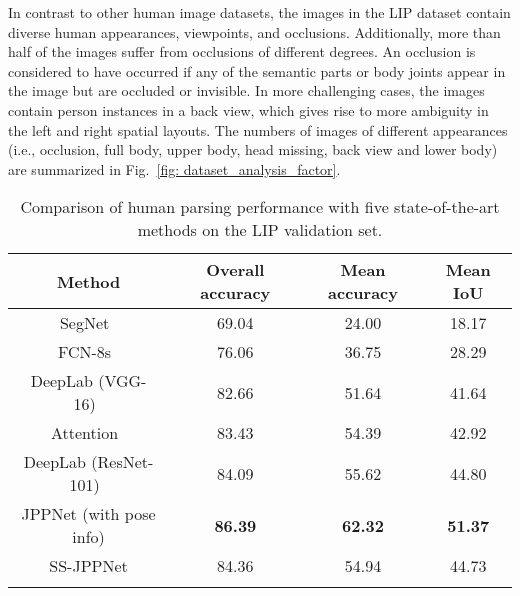 \documentclass[10pt,journal,compsoc]{IEEEtran}
\begin{document}
In contrast to other human image datasets, the images in the LIP dataset contain diverse human appearances, viewpoints, and occlusions. Additionally, more than half of the images suffer from occlusions of different degrees. An occlusion is considered to have occurred if any of the semantic parts or body joints appear in the image but are occluded or invisible. In more challenging cases, the images contain person instances in a back view, which gives rise to more ambiguity in the left and right spatial layouts. The numbers of images of different appearances (i.e., occlusion, full body, upper body, head missing, back view and lower body) are summarized in Fig.~\ref{fig: dataset_analysis_factor}.



\begin{table}[t]
\centering
\scriptsize
\caption{Comparison of human parsing performance with five state-of-the-art methods on the LIP validation set.}
\vspace{-3mm}
\label{tab: lip_val}
\begin{tabular}{cccc}
\toprule[0.7pt]
   Method                                      & Overall accuracy   & Mean accuracy    & Mean IoU    \\ \hline 
   SegNet~\cite{badrinarayanan2015segnet}      & 69.04              & 24.00            & 18.17       \\
   FCN-8s~\cite{long2014fully}                 & 76.06              & 36.75            & 28.29       \\
   DeepLab (VGG-16)~\cite{chen2016deeplab}     & 82.66              & 51.64            & 41.64       \\
   Attention~\cite{chen2015attention}          & 83.43              & 54.39            & 42.92       \\ 
   DeepLab (ResNet-101)~\cite{chen2016deeplab} & 84.09              & 55.62            & 44.80       \\    \hline
   JPPNet {(with pose info)}          & \textbf{86.39}     & \textbf{62.32}   & \textbf{51.37}       \\
   SS-JPPNet                                   & 84.36              & 54.94            & 44.73       \\
\toprule[0.7pt]
\vspace{-6mm}
\end{tabular}
\end{table}
\end{document}
